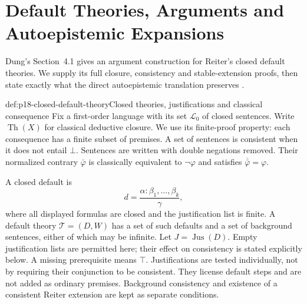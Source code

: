 \chapter{Default Theories, Arguments and Autoepistemic Expansions}
\label{sec:p18-default-autoepistemic-argumentation}

Dung's Section~4.1 gives an argument construction for
Reiter's closed default theories. We supply its full
closure, consistency and stable-extension proofs, then
state exactly what the direct autoepistemic translation
preserves \cite[pp.~339--341]{Dung1995}.

\begin{hbdefinition}{def:p18-closed-default-theory}{Closed theories, justifications and classical consequence}
Fix a first-order language with its set \(\mathcal L_0\)
of closed sentences. Write \(\operatorname{Th}(X)\)
for classical deductive closure. We use its finite-proof
property: each consequence has a finite subset of
premises. A set of sentences is consistent when it does not
entail \(\bot\). Sentences are written with double
negations removed. Their normalized contrary
\(\bar\varphi\) is classically equivalent to
\(\neg\varphi\) and satisfies
\(\overline{\bar\varphi}=\varphi\).

A closed default is
\[
                 d=\frac{\alpha:\beta_1,\ldots,\beta_k}{\gamma},
\]
where all displayed formulas are closed and the
justification list is finite. A default theory
\(\mathcal T=(D,W)\) has a set of such defaults
and a set of background sentences, either of
which may be infinite. Let \(J=\operatorname{Jus}(D)\).
Empty justification lists are permitted here;
their effect on consistency is stated explicitly
below. A missing prerequisite means \(\top\).
Justifications are tested individually, not by
requiring their conjunction to be consistent.
They license default steps and are not added
as ordinary premises.
Background consistency and existence of a
consistent Reiter extension are kept as
separate conditions.
\end{hbdefinition}

